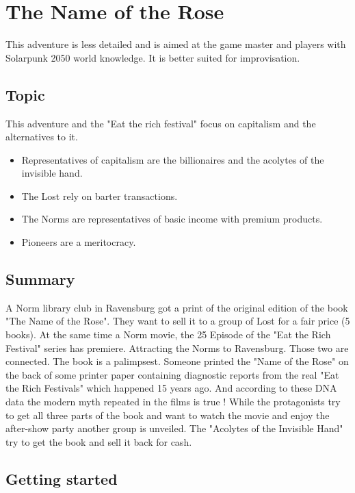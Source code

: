 \chapter{The Name of the Rose}
\label{ch:the name of the rose}

This adventure is less detailed and is aimed at the game master and players with Solarpunk 2050 world knowledge. It is better suited for improvisation.

\section{Topic}

This adventure and the "Eat the rich festival" focus on capitalism and the alternatives to it.
\begin{itemize}
    \item Representatives of capitalism are the billionaires and the acolytes of the invisible hand.
    \item The Lost rely on barter transactions.
    \item The Norms are representatives of basic income with premium products.
    \item Pioneers are a meritocracy.
\end{itemize}

\section{Summary}

A Norm library club in Ravensburg got a print of the original edition of the book "The Name of the Rose". They want to sell it to a group of Lost for a fair price (5 books).
At the same time a Norm movie, the 25 Episode of the "Eat the Rich Festival" series has premiere. Attracting the Norms to Ravensburg. Those two are connected.
The book is a palimpsest. Someone printed the "Name of the Rose" on the back of some printer paper containing diagnostic reports from the real "Eat the Rich Festivals" which happened 15 years ago. And according to these DNA data the modern myth repeated in the films is true !
While the protagonists try to get all three parts of the book and want to watch the movie and enjoy the after-show party another group is unveiled. The "Acolytes of the Invisible Hand" try to get the book and sell it back for cash.


\section{Getting started}
